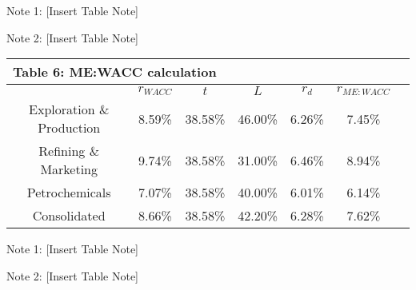 \documentclass[AER]{AEA}
\begin{document}
\begin{spacing}{1.5}
\begin{table}[h!]
    \begin{tablenotes}
    \item Note 1: [Insert Table Note]
    \item Note 2: [Insert Table Note]
    \end{tablenotes}
\end{table}

\begin{table}[h!]
    \centering
    \begin{tabular}{|c|c|c|c|c|c|c|}
    \multicolumn{6}{l}{\textbf{Table 6: ME:WACC calculation}}\\
    \hline
    & $r_{WACC}$ & $t$ & $L$ & $r_d$ & $r_{ME:WACC}$ \\ \hline
    Exploration \& Production & 8.59\% & 38.58\% & 46.00\% & 6.26\% & 7.45\% \\ \hline
    Refining \& Marketing & 9.74\% & 38.58\% & 31.00\% & 6.46\% & 8.94\% \\ \hline
    Petrochemicals & 7.07\% & 38.58\% & 40.00\% & 6.01\% & 6.14\% \\ \hline
    Consolidated & 8.66\% & 38.58\% & 42.20\% & 6.28\% & 7.62\% \\ \hline
    \end{tabular}
    \begin{tablenotes}
    \item Note 1: [Insert Table Note]
    \item Note 2: [Insert Table Note]
    \end{tablenotes}
\end{table}


\end{spacing}
\end{document}
